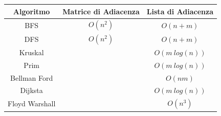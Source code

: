 \documentclass{article}
\begin{document}
\begin{center}
\begin{tabular}{||c | c c||} 
 \hline
 Algoritmo & Matrice di Adiacenza & Lista di Adiacenza \\ [0.5ex] 
 \hline\hline
 BFS & $O(n^2)$ & $O(n + m)$ \\ 
 \hline
 DFS & $O(n^2)$ & $O(n + m)$ \\ 
 \hline
 Kruskal &  & $O(m\ log(n))$ \\ 
 \hline
 Prim &  & $O(m\ log(n))$  \\ 
 \hline
 Bellman Ford &  & $O(nm)$ \\ 
 \hline
 Dijksta &  & $O(m\ log(n))$ \\ 
 \hline
 Floyd Warshall &  & $O(n^3)$ \\ 
 \hline
\end{tabular}
\end{center}
\end{document}
